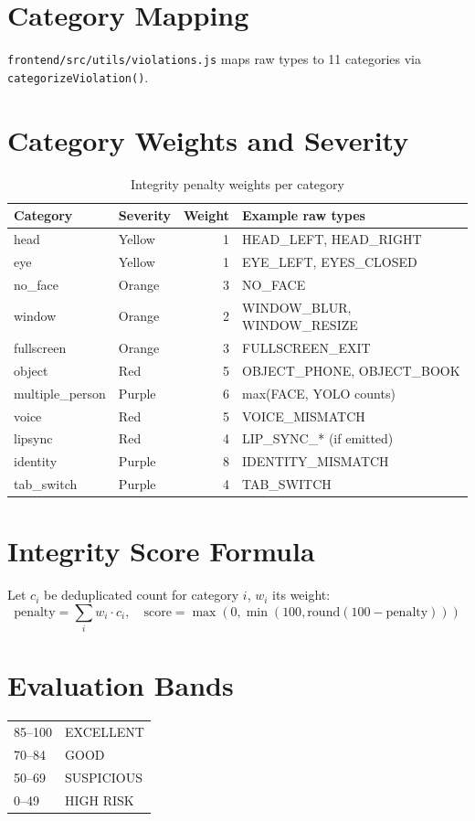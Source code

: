 \documentclass[11pt,a4paper]{report}
\begin{document}
\section{Category Mapping}
\texttt{frontend/src/utils/violations.js} maps raw types to 11 categories via \texttt{categorizeViolation()}.

\section{Category Weights and Severity}

\begin{table}[H]
\centering
\small
\caption{Integrity penalty weights per category}
\begin{tabular}{@{}llrl@{}}
\toprule
\textbf{Category} & \textbf{Severity} & \textbf{Weight} & \textbf{Example raw types} \\
\midrule
head & Yellow & 1 & HEAD\_LEFT, HEAD\_RIGHT \\
eye & Yellow & 1 & EYE\_LEFT, EYES\_CLOSED \\
no\_face & Orange & 3 & NO\_FACE \\
window & Orange & 2 & WINDOW\_BLUR, WINDOW\_RESIZE \\
fullscreen & Orange & 3 & FULLSCREEN\_EXIT \\
object & Red & 5 & OBJECT\_PHONE, OBJECT\_BOOK \\
multiple\_person & Purple & 6 & max(FACE, YOLO counts) \\
voice & Red & 5 & VOICE\_MISMATCH \\
lipsync & Red & 4 & LIP\_SYNC\_* (if emitted) \\
identity & Purple & 8 & IDENTITY\_MISMATCH \\
tab\_switch & Purple & 4 & TAB\_SWITCH \\
\bottomrule
\end{tabular}
\end{table}

\section{Integrity Score Formula}
Let $c_i$ be deduplicated count for category $i$, $w_i$ its weight:
\[
\text{penalty} = \sum_i w_i \cdot c_i,\quad
\text{score} = \max(0, \min(100, \mathrm{round}(100 - \text{penalty})))
\]

\section{Evaluation Bands}
\begin{tabular}{@{}ll@{}}
85--100 & EXCELLENT \\
70--84 & GOOD \\
50--69 & SUSPICIOUS \\
0--49 & HIGH RISK \\
\end{tabular}
\end{document}
